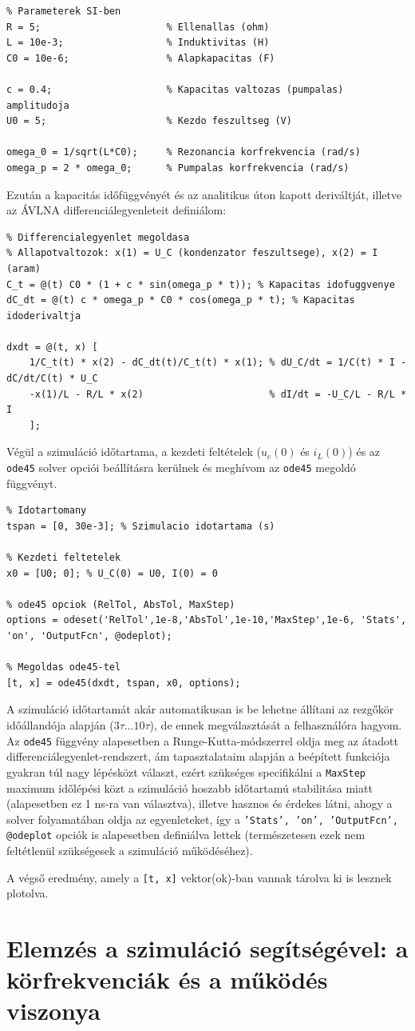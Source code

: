 \documentclass[12pt,a4paper]{article}
\begin{document}
\begin{lstlisting}
% Parameterek SI-ben
R = 5;                      % Ellenallas (ohm)
L = 10e-3;                  % Induktivitas (H)
C0 = 10e-6;                 % Alapkapacitas (F)

c = 0.4;                    % Kapacitas valtozas (pumpalas) amplitudoja
U0 = 5;                     % Kezdo feszultseg (V)

omega_0 = 1/sqrt(L*C0);     % Rezonancia korfrekvencia (rad/s)
omega_p = 2 * omega_0;      % Pumpalas korfrekvencia (rad/s)
\end{lstlisting}

Ezután a kapacitás időfüggvényét és az analitikus úton kapott deriváltját, illetve az ÁVLNA differenciálegyenleteit definiálom:

\begin{lstlisting}
% Differencialegyenlet megoldasa
% Allapotvaltozok: x(1) = U_C (kondenzator feszultsege), x(2) = I (aram)
C_t = @(t) C0 * (1 + c * sin(omega_p * t)); % Kapacitas idofuggvenye
dC_dt = @(t) c * omega_p * C0 * cos(omega_p * t); % Kapacitas idoderivaltja

dxdt = @(t, x) [
    1/C_t(t) * x(2) - dC_dt(t)/C_t(t) * x(1); % dU_C/dt = 1/C(t) * I - dC/dt/C(t) * U_C
    -x(1)/L - R/L * x(2)                      % dI/dt = -U_C/L - R/L * I
    ];
\end{lstlisting}

Végül a szimuláció időtartama, a kezdeti feltételek ($u_c(0)$ és $i_L(0)$) és az \texttt{ode45} solver opciói beállításra kerülnek és meghívom az \texttt{ode45} megoldó függvényt.

\begin{lstlisting}
% Idotartomany
tspan = [0, 30e-3]; % Szimulacio idotartama (s)

% Kezdeti feltetelek
x0 = [U0; 0]; % U_C(0) = U0, I(0) = 0

% ode45 opciok (RelTol, AbsTol, MaxStep)
options = odeset('RelTol',1e-8,'AbsTol',1e-10,'MaxStep',1e-6, 'Stats', 'on', 'OutputFcn', @odeplot);

% Megoldas ode45-tel
[t, x] = ode45(dxdt, tspan, x0, options);
\end{lstlisting}

A szimuláció időtartamát akár automatikusan is be lehetne állítani az rezgőkör időállandója alapján ($3\tau \dots 10 \tau$), de ennek megválasztását
a felhasználóra hagyom. Az \texttt{ode45} függvény alapesetben a Runge-Kutta-módszerrel oldja meg az átadott differenciálegyenlet-rendszert, ám tapasztalataim
alapján a beépített funkciója gyakran túl nagy lépésközt választ, ezért szükséges specifikálni a \texttt{MaxStep} maximum időlépési közt a szimuláció
hoszabb időtartamú stabilitása miatt (alapesetben ez 1 ns-ra van választva), illetve hasznos és érdekes látni, ahogy a solver folyamatában oldja az egyenleteket,
így a \texttt{'Stats', 'on', 'OutputFcn', @odeplot} opciók is alapesetben definiálva lettek (természetesen ezek nem feltétlenül szükségesek a szimuláció működéséhez).

A végső eredmény, amely a \texttt{[t, x]} vektor(ok)-ban vannak tárolva ki is lesznek plotolva.

\section{Elemzés a szimuláció segítségével: a körfrekvenciák és a működés viszonya}
\end{document}
